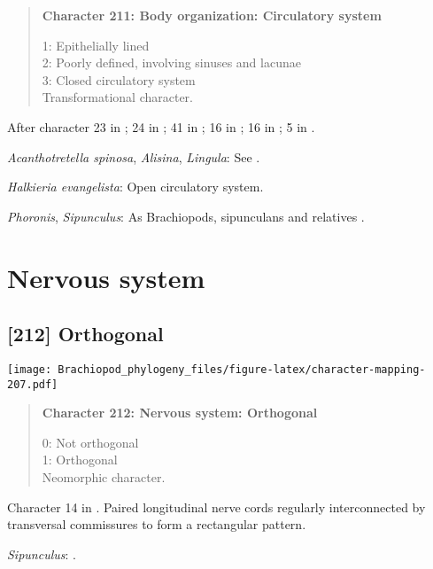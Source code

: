 \documentclass[openany]{book}
\theoremstyle{definition}
\theoremstyle{definition}
\theoremstyle{definition}
\theoremstyle{remark}
\begin{document}
\begin{quote}
\textbf{Character 211: Body organization: Circulatory system}

1: Epithelially lined\\
2: Poorly defined, involving sinuses and lacunae\\
3: Closed circulatory system\\
Transformational character.
\end{quote}

After character 23 in \citet{Haszprunar1996}; 24 in
\citet{Haszprunar2000}; 41 in \citet{Rouse1999}; 16 in
\citet{Scheltema1993}; 16 in \citet{Vinther2008}; 5 in
\citet{Haszprunar2008}.

\hypertarget{Acanthotretella_spinosa-coding-211}{}
\emph{Acanthotretella spinosa}, \emph{Alisina}, \emph{Lingula}: See
\citet{Haszprunar2008}.

\hypertarget{Halkieria_evangelista-coding-211}{}
\emph{Halkieria evangelista}: Open circulatory system.

\hypertarget{Phoronis-coding-211}{}
\emph{Phoronis}, \emph{Sipunculus}: As Brachiopods, sipunculans and
relatives \citep{Ruppert1983}.

\section{Nervous system}\label{nervous-system}

\subsection*{{[}212{]} Orthogonal}\label{orthogonal}

\texttt{[image: Brachiopod\_phylogeny\_files/figure-latex/character-mapping-207.pdf]}

\begin{quote}
\textbf{Character 212: Nervous system: Orthogonal}

0: Not orthogonal\\
1: Orthogonal\\
Neomorphic character.
\end{quote}

Character 14 in \citet{Haszprunar1996}. Paired longitudinal nerve cords
regularly interconnected by transversal commissures to form a
rectangular pattern.

\hypertarget{Sipunculus-coding-212}{}
\emph{Sipunculus}: \citet{Temereva2016Thenervous}.
\end{document}
